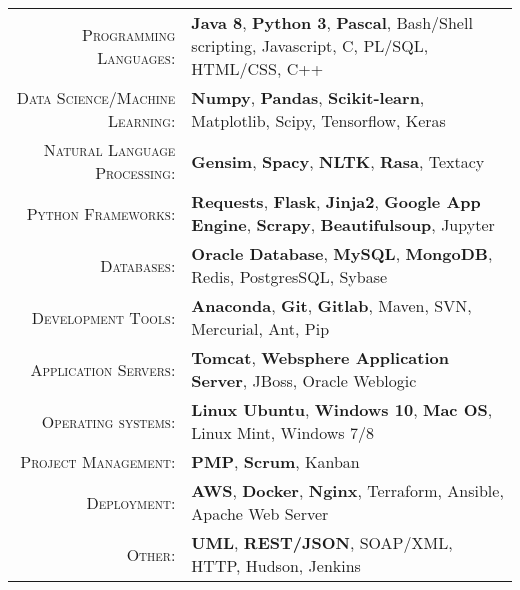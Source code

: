 %
%
%

\renewcommand{\arraystretch}{1.1}
	\begin{tabular}{>{}r>{}p{13cm}} 
		\textsc{Programming Languages:}  		&   \textbf{Java 8}, \textbf{Python 3}, \textbf{Pascal}, Bash/Shell scripting, Javascript, C, PL/SQL,  HTML/CSS, C++\\ 
		\textsc{Data Science/Machine Learning:}                  &   \textbf{Numpy}, \textbf{Pandas}, \textbf{Scikit-learn}, Matplotlib, Scipy, Tensorflow, Keras\\
		\textsc{Natural Language Processing:} 	 & \textbf{Gensim}, \textbf{Spacy}, \textbf{NLTK}, \textbf{Rasa}, Textacy\\
		\textsc{Python Frameworks:} 				& \textbf{Requests}, \textbf{Flask}, \textbf{Jinja2}, \textbf{Google App Engine}, \textbf{Scrapy}, \textbf{Beautifulsoup}, Jupyter\\ 
		\textsc{Databases:}                  &   \textbf{Oracle Database}, \textbf{MySQL}, \textbf{MongoDB}, Redis, PostgresSQL, Sybase \\ 
		\textsc{Development Tools:} & 	  		\textbf{Anaconda}, \textbf{Git}, \textbf{Gitlab}, Maven, SVN, Mercurial, Ant, Pip \\
		\textsc{Application Servers:}				        &   \textbf{Tomcat}, \textbf{Websphere Application Server}, JBoss, Oracle Weblogic \\ 
		\textsc{Operating systems:}	        &   \textbf{Linux Ubuntu}, \textbf{Windows 10}, \textbf{Mac OS}, Linux Mint, Windows 7/8\\ 
		\textsc{Project Management:}				        &   \textbf{PMP}, \textbf{Scrum}, Kanban \\
		\textsc{Deployment:}				        &   \textbf{AWS}, \textbf{Docker}, \textbf{Nginx}, Terraform, Ansible, Apache Web Server\\
		\textsc{Other:}					        &   \textbf{UML}, \textbf{REST/JSON}, SOAP/XML, HTTP, Hudson, Jenkins \\
	\end{tabular}